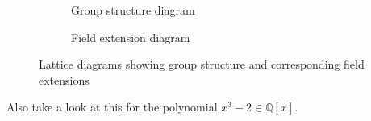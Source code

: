   \begin{figure}[H]
    \centering
    \begin{subfigure}[b]{0.48\textwidth}
      \centering
      \caption{Group structure diagram}
      \label{fig:group_structure}
    \end{subfigure}
    \hfill 
    \begin{subfigure}[b]{0.48\textwidth}
      \centering
      \caption{Field extension diagram}
      \label{fig:field_extension}
    \end{subfigure}
    \caption{Lattice diagrams showing group structure and corresponding field extensions}
    \label{fig:lattice_diagrams}
  \end{figure}

  Also take a look at this for the polynomial $x^3 - 2 \in \mathbb{Q}[x]$. 

